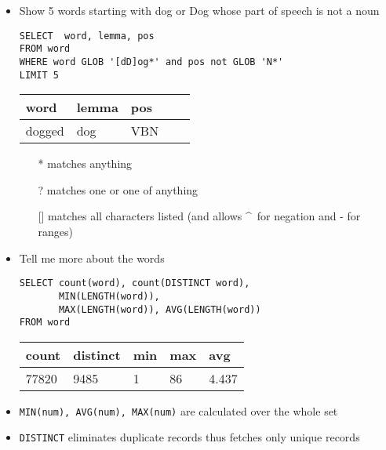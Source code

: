 \documentclass[a4paper,landscape,headrule,footrule,dvips]{foils}
\begin{document}
\begin{CJK}{UTF8}{min}
\begin{itemize}
\item Show 5 words starting with dog or Dog whose part of speech is not a noun
\begin{verbatim}
SELECT  word, lemma, pos
FROM word
WHERE word GLOB '[dD]og*' and pos not GLOB 'N*'
LIMIT 5
\end{verbatim}
  \begin{tabular}{lllll}
    \textbf{word}  & \textbf{lemma}  &  \textbf{pos} \\ \hline
    dogged  & dog &  VBN \\
  \end{tabular}
\begin{itemize}
\item[*] matches anything
\item[?] matches one or one of anything
\item[{[]}] matches all characters listed (and allows \textasciicircum\ for negation and - for ranges)
\end{itemize}
\end{itemize}


\begin{itemize}
\item Tell me more about the words
\begin{verbatim}
SELECT count(word), count(DISTINCT word),
       MIN(LENGTH(word)), 
       MAX(LENGTH(word)), AVG(LENGTH(word))
FROM word
\end{verbatim}
  \begin{tabular}{lllll}
    \textbf{count}  & \textbf{distinct} &\textbf{min}  &  \textbf{max} & \textbf{avg} \\ \hline
    77820 & 9485 & 1 & 86 & 4.437
  \end{tabular}
\item  \texttt{MIN(num), AVG(num), MAX(num)} are calculated over the whole set
\item \texttt{DISTINCT} eliminates duplicate records thus fetches only unique records
\end{itemize}


\end{CJK}
\end{document}
